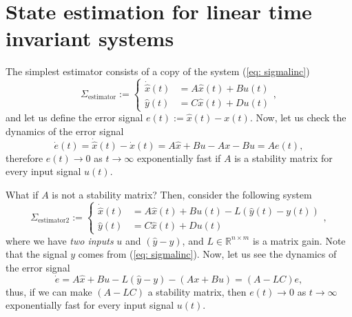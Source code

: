 \documentclass[11pt,a4paper,titlepage]{article}
\begin{document}
\section{State estimation for linear time invariant systems}
The simplest estimator consists of a copy of the system (\ref{eq: sigmalinc})
\begin{equation}
	\Sigma_{\text{estimator}} := \begin{cases}
		\dot{\hat x}(t) &= A \hat x(t) + B u(t) \\
		\hat y(t) &= C\hat x(t) + D u(t)
	\end{cases},
\label{eq: sigmaest}
\end{equation}
and let us define the error signal $e(t) := \hat x(t) - x(t)$. Now, let us check the dynamics of the error signal
\begin{equation}
	\dot e(t) = \dot{\hat x}(t) - \dot x(t) = A\hat x + Bu - Ax - Bu = Ae(t),
\end{equation}
therefore $e(t)\to 0$ as $t\to\infty$ exponentially fast if $A$ is a stability matrix for every input signal $u(t)$.

What if $A$ is not a stability matrix? Then, consider the following system
\begin{equation}
	\Sigma_{\text{estimator2}} := \begin{cases}
		\dot{\hat x}(t) &= A \hat x(t) + B u(t) - L(\hat y(t) - y(t)) \\
		\hat y(t) &= C\hat x(t) + D u(t)
	\end{cases},
\label{eq: sigmaest2}
\end{equation}
where we have \emph{two inputs} $u$ and $(\hat y - y)$, and $L\in\mathbb{R}^{n\times m}$ is a matrix gain. Note that the signal $y$ comes from (\ref{eq: sigmalinc}). Now, let us see the dynamics of the error signal
\begin{equation}
	\dot e = A\hat x + Bu - L(\hat y - y) - (Ax + Bu) = (A-LC)e,\label{eq: ed} 
\end{equation}
thus, if we can make $(A-LC)$ a stability matrix, then $e(t)\to 0$ as $t\to\infty$ exponentially fast for every input signal $u(t)$. 
\end{document}
